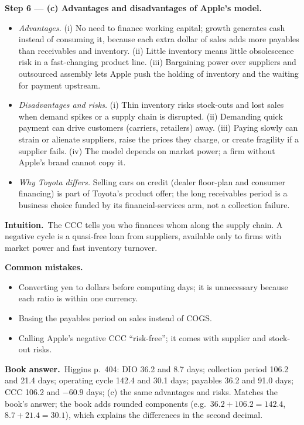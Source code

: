 \documentclass[11pt,a4paper]{article}
\newcommand{\step}[2]{\par\medskip\noindent\textbf{Step #1 --- #2.}~}
\newcommand{\intuition}{\par\medskip\noindent\textbf{Intuition.}~}
\newcommand{\bookans}{\par\medskip\noindent\textbf{Book answer.}~}
\newcommand{\pitfalls}{\par\medskip\noindent\textbf{Common mistakes.}}
\begin{document}
\step{6}{(c) Advantages and disadvantages of Apple's model}
\begin{itemize}
  \item \emph{Advantages.} (i) No need to finance working capital; growth generates cash instead of
        consuming it, because each extra dollar of sales adds more payables than receivables and
        inventory. (ii) Little inventory means little obsolescence risk in a fast-changing product
        line. (iii) Bargaining power over suppliers and outsourced assembly lets Apple push the
        holding of inventory and the waiting for payment upstream.
  \item \emph{Disadvantages and risks.} (i) Thin inventory risks stock-outs and lost sales when
        demand spikes or a supply chain is disrupted. (ii) Demanding quick payment can drive
        customers (carriers, retailers) away. (iii) Paying slowly can strain or alienate
        suppliers, raise the prices they charge, or create fragility if a supplier fails. (iv) The
        model depends on market power; a firm without Apple's brand cannot copy it.
  \item \emph{Why Toyota differs.} Selling cars on credit (dealer floor-plan and consumer
        financing) is part of Toyota's product offer; the long receivables period is a business
        choice funded by its financial-services arm, not a collection failure.
\end{itemize}

\intuition The CCC tells you who finances whom along the supply chain. A negative cycle is a
quasi-free loan from suppliers, available only to firms with market power and fast inventory
turnover.

\pitfalls
\begin{itemize}
  \item Converting yen to dollars before computing days; it is unnecessary because each ratio is
        within one currency.
  \item Basing the payables period on sales instead of COGS.
  \item Calling Apple's negative CCC ``risk-free''; it comes with supplier and stock-out risks.
\end{itemize}

\bookans Higgins p.~404: DIO 36.2 and 8.7 days; collection period 106.2 and 21.4 days; operating
cycle 142.4 and 30.1 days; payables 36.2 and 91.0 days; CCC 106.2 and $-60.9$ days; (c) the same
advantages and risks. Matches the book's answer; the book adds rounded components (e.g.\ $36.2 +
106.2 = 142.4$, $8.7 + 21.4 = 30.1$), which explains the differences in the second decimal.
\end{document}
